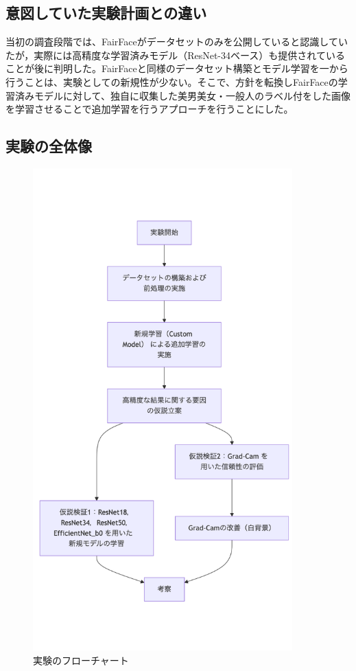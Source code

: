\documentclass[a4paper,11pt,titlepage]{jsarticle}
\begin{document}
\subsection{意図していた実験計画との違い}
\label{label:意図していた実験計画との違い}
当初の調査段階では、FairFaceがデータセットのみを公開していると認識していたが，実際には高精度な学習済みモデル（ResNet-34ベース）も提供されていることが後に判明した。FairFaceと同様のデータセット構築とモデル学習を一から行うことは、実験としての新規性が少ない。そこで、方針を転換しFairFaceの学習済みモデルに対して、独自に収集した美男美女・一般人のラベル付をした画像を学習させることで追加学習を行うアプローチを行うことにした。

\subsection{実験の全体像}
\begin{figure}[H]
    \centering
    \includegraphics[width=100mm]{overall.png}
    \caption{実験のフローチャート}
    \label{fig:csv}
\end{figure}
\end{document}
